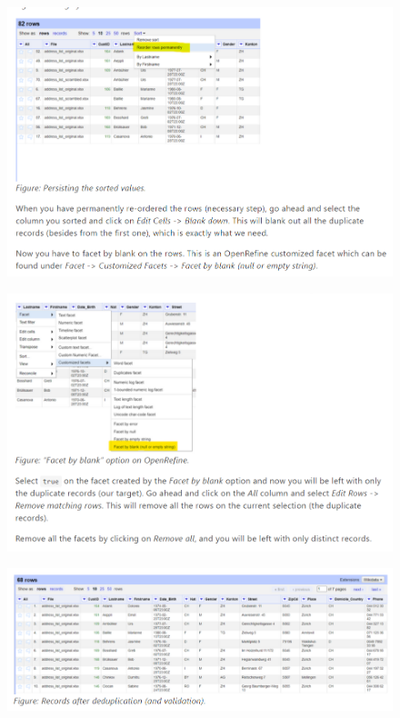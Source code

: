 \begin{figure}[H]
    \includegraphics[width=\linewidth]{./Figures/Appendices/worksheet/35.png}
\end{figure}
\begin{figure}[H]
    \includegraphics[width=\linewidth]{./Figures/Appendices/worksheet/36.png}
\end{figure}
\begin{figure}[H]
    \includegraphics[width=\linewidth]{./Figures/Appendices/worksheet/37.png}
\end{figure}
